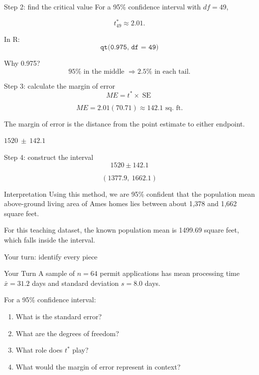 \documentclass[11pt,aspectratio=169]{beamer}
\newcommand{\yourturn}[1]{%
\begin{center}
\begin{minipage}{0.90\textwidth}
\begin{alertblock}{Your Turn}
#1
\end{alertblock}
\end{minipage}
\end{center}}
\newcommand{\SE}{\operatorname{SE}}
\begin{document}
\begin{frame}{Step 2: find the critical value}
For a 95\% confidence interval with $df=49$,

\[
t^*_{49}\approx\boxed{2.01}.
\]

In R:
\[\texttt{qt(0.975, df = 49)}\]

Why 0.975?
\[
95\%\text{ in the middle }\Rightarrow 2.5\%\text{ in each tail.}
\]
\end{frame}

\begin{frame}{Step 3: calculate the margin of error}
\[
ME=t^*\times\SE
\]

\[
ME=2.01(70.71)\approx\boxed{142.1\text{ sq. ft.}}
\]

\vspace{0.8em}
The margin of error is the distance from the point estimate to either endpoint.

\vfill
\begin{center}
\large $1520\ \pm\ 142.1$
\end{center}
\end{frame}

\begin{frame}{Step 4: construct the interval}
\[
1520\pm142.1
\]

\[
\boxed{(1377.9,\ 1662.1)}
\]

\vspace{0.8em}
\begin{alertblock}{Interpretation}
Using this method, we are 95\% confident that the population mean above-ground living area of Ames homes lies between about 1,378 and 1,662 square feet.
\end{alertblock}

\vfill
For this teaching dataset, the known population mean is 1499.69 square feet, which falls inside the interval.
\end{frame}

\begin{frame}{Your turn: identify every piece}
\yourturn{A sample of $n=64$ permit applications has mean processing time $\bar{x}=31.2$ days and standard deviation $s=8.0$ days.

For a 95\% confidence interval:
\begin{enumerate}
  \item What is the standard error?
  \item What are the degrees of freedom?
  \item What role does $t^*$ play?
  \item What would the margin of error represent in context?
\end{enumerate}}
\end{frame}
\end{document}
